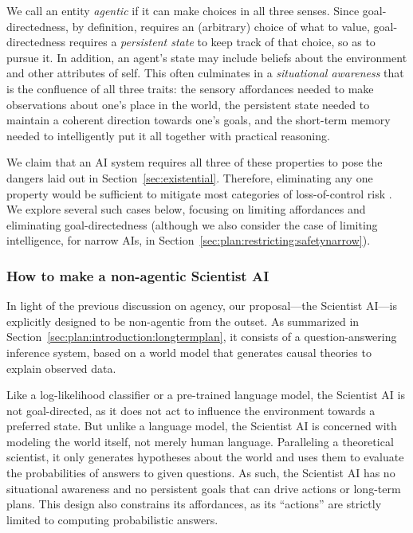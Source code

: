 We call an entity \emph{agentic} if it can make choices in all three senses. 
Since goal-directedness, by definition, requires an (arbitrary) choice of what to value, goal-directedness requires a \emph{persistent state} to keep track of that choice, so as to pursue it.
In addition, an agent's state may include beliefs about the environment and other attributes of self.
This often culminates in a \emph{situational awareness} that is the confluence of all three traits: the sensory affordances needed to make observations about one's place in the world, the persistent state needed to maintain a coherent direction towards one's goals, and the short-term memory needed to intelligently put it all together with practical reasoning.

We claim that an AI system requires all three of these properties to pose the dangers laid out in Section~\ref{sec:existential}. Therefore, eliminating any one property would be sufficient to mitigate most categories of loss-of-control risk \cite{neurips.cc.virtual.2024.workshop.84748}.
We explore several such cases below, focusing on limiting affordances and eliminating goal-directedness (although we also consider the case of limiting intelligence, for narrow AIs, in Section~\ref{sec:plan:restricting:safetynarrow}).
 
\subsubsection{How to make a non-agentic Scientist AI}
\label{sec:plan:restricting:scai}

In light of the previous discussion on agency, our proposal---the Scientist AI---is explicitly designed to be non-agentic from the outset. As summarized in Section~\ref{sec:plan:introduction:longtermplan}, it consists of a question-answering inference system, based on a world model that generates causal theories to explain observed data.  

Like a log-likelihood classifier or a pre-trained language model, the Scientist AI is not goal-directed, as it does not act to influence the environment towards a preferred state. But unlike a language model, the Scientist AI is concerned with modeling the world itself, not merely human language. Paralleling a theoretical scientist, it only generates hypotheses about the world and uses them to evaluate the probabilities of answers to given questions. As such, the Scientist AI has no situational awareness and no persistent goals that can drive actions or long-term plans. This design also constrains its affordances, as its ``actions'' are strictly limited to computing probabilistic answers.  

